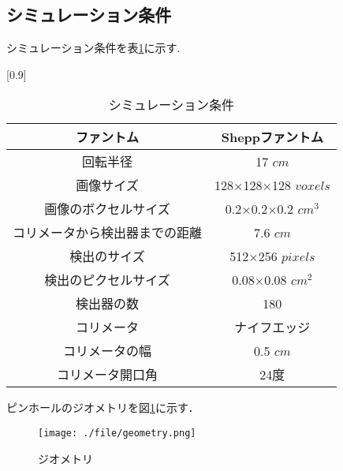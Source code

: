 \documentclass[dvipdfmx,autodetect-engine,twocolumn,10pt]{jsarticle}%
\begin{document}
\subsection{シミュレーション条件}
シミュレーション条件を表\ref{simu_2d}に示す.
\begin{table}[htbp]
  \begin{center}
    \caption{シミュレーション条件}
    \label{simu_2d}
    \small
    \scalebox{0.82}[0.9]
    {
      \begin{tabular}{|c|c|} \hline
        ファントム & Sheppファントム \\ \hline
        回転半径 & 17 $cm$ \\ \hline
        画像サイズ & 128×128×128 $voxels$ \\ \hline
        画像のボクセルサイズ & 0.2×0.2×0.2 $cm^3$ \\ \hline
        コリメータから検出器までの距離 & 7.6 $cm$ \\ \hline
        検出のサイズ & 512×256 $pixels$ \\ \hline
        検出のピクセルサイズ & 0.08×0.08 $cm^2$ \\ \hline
        検出器の数 & 180 \\ \hline
        コリメータ & ナイフエッジ \\ \hline
        コリメータの幅 & 0.5 $cm$ \\ \hline
        コリメータ開口角 & 24度 \\ \hline
      \end{tabular}
    }
  \end{center}
\end{table}

ピンホールのジオメトリを図\ref{pinhole}に示す．
\begin{figure}[htbp]
  \begin{center}
    \texttt{[image: ./file/geometry.png]}\\
    \caption{ジオメトリ}
    \label{pinhole}
  \end{center}
\end{figure}
\end{document}
